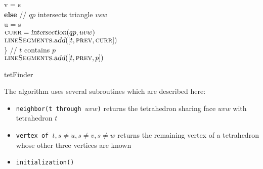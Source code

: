 \documentclass[../thesis.tex]{subfiles}
\begin{document}
\begin{algo*}
{\begin{numbertabbing}
      \> \> \> \> v = s \label{}\\
      \> \> \> \textbf{else} // $qp$ intersects triangle $vsw$ \label{}\\
      \> \> \> \> u = s \label{}\\
      \> \> $\textsc{curr} = \textsl{intersection}(qp, uvw)$ \label{}\\
      \> \> $\textsc{lineSegments}.\textsl{add}([t, \textsc{prev}, \textsc{curr}])$ \label{}\\
      \> \} // $t$ contains $p$ \label{}\\
      \> $\textsc{lineSegments}.\textsl{add}([t, \textsc{prev}, p])$ \label{}\\
    \end{numbertabbing}
  }
  \caption{tetFinder}
  \label{alg:tetFinder}
\end{algo*}
The algorithm uses several subroutines which are described here:
  \begin{itemize}
    \item \texttt{neighbor(t through $uvw$)} returns the tetrahedron sharing face $uvw$ with tetrahedron $t$
    \item \texttt{vertex of $t, s \neq u, s \neq v, s \neq w$} returns the remaining vertex of a tetrahedron whose other three
    vertices are known
    \item \texttt{initialization()}
  \end{itemize}
\end{document}

